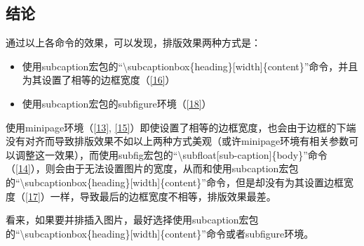\documentclass{article}
\begin{document}
\subsection{结论}
    通过以上各命令的效果，可以发现，排版效果两种方式是：

    \begin{itemize}
        \item 使用subcaption宏包的``\textbackslash subcaptionbox\{heading\}[width]\{content\}''命令，并且为其设置了相等的边框宽度（\ref{16}）
        \item 使用subcaption宏包的subfigure环境（\ref{18}）
    \end{itemize}
    
    使用minipage环境（\ref{13}, \ref{15}）即使设置了相等的边框宽度，也会由于边框的下端没有对齐而导致排版效果不如以上两种方式美观（或许minipage环境有相关参数可以调整这一效果），而使用subfig宏包的``\textbackslash subfloat[sub-caption]\{body\}''命令（\ref{14}），则会由于无法设置图片的宽度，从而和使用subcaption宏包的``\textbackslash subcaptionbox\{heading\}[width]\{content\}''命令，但是却没有为其设置边框宽度（\ref{17}）一样，导致最后的边框宽度不相等，排版效果最差。
    
    看来，如果要并排插入图片，最好选择使用subcaption宏包的``\textbackslash subcaptionbox\{heading\}[width]\{content\}''命令或者subfigure环境。
    

\listoffigures
\end{document}
